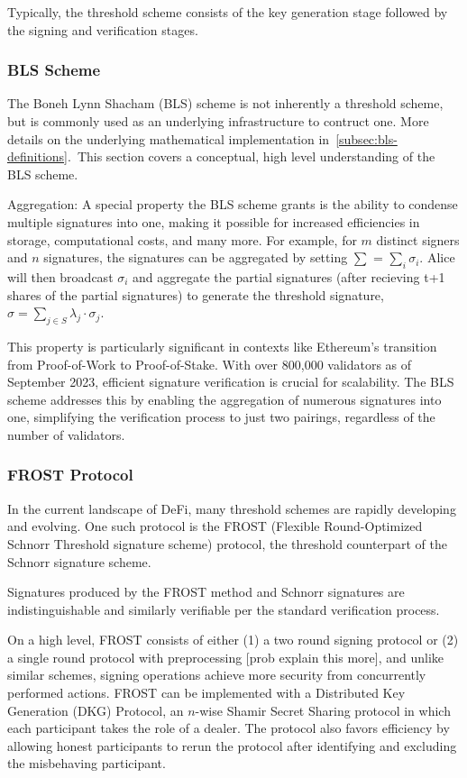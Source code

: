 \documentclass[12pt]{article}
\begin{document}
Typically, the threshold scheme consists of the key generation stage followed by the signing and verification stages. 

\subsubsection{BLS Scheme}

The Boneh Lynn Shacham (BLS) scheme is not inherently a threshold scheme, but is commonly used as an underlying infrastructure to contruct one. More details on the underlying mathematical implementation in~\ref{subsec:bls-definitions}.\ This section covers a conceptual, high level understanding of the BLS scheme.

Aggregation: A special property the BLS scheme grants is the ability to condense multiple signatures into one, making it possible for increased efficiencies in storage, computational costs, and many more. For example, for \(m\) distinct signers and \(n\) signatures, the signatures can be aggregated by setting \( \sum \) = \( \sum_i \)\( \sigma_i \). Alice will then broadcast \( \sigma_i \) and aggregate the partial signatures (after recieving t+1 shares of the partial signatures) to generate the threshold signature, \( \sigma = \sum_{j \in S} \lambda_j \cdot \sigma_j \).

This property is particularly significant in contexts like Ethereum's transition from Proof-of-Work to Proof-of-Stake. With over 800,000 validators as of September 2023, efficient signature verification is crucial for scalability. The BLS scheme addresses this by enabling the aggregation of numerous signatures into one, simplifying the verification process to just two pairings, regardless of the number of validators.

\subsubsection{FROST Protocol}
In the current landscape of DeFi, many threshold schemes are rapidly developing and evolving. One such protocol is the FROST (Flexible Round-Optimized Schnorr Threshold signature scheme) protocol, the threshold counterpart of the Schnorr signature scheme. 

Signatures produced by the FROST method and Schnorr signatures are indistinguishable and similarly verifiable per the standard verification process.  

On a high level, FROST consists of either (1) a two round signing protocol or (2) a single round protocol with preprocessing [prob explain this more], and unlike similar schemes, signing operations achieve more security from concurrently performed actions. FROST can be implemented with a Distributed Key Generation (DKG) Protocol, an \(n\)-wise Shamir Secret Sharing protocol in which each participant takes the role of a dealer. The protocol also favors efficiency by allowing honest participants to rerun the protocol after identifying and excluding the misbehaving participant. 
\end{document}
